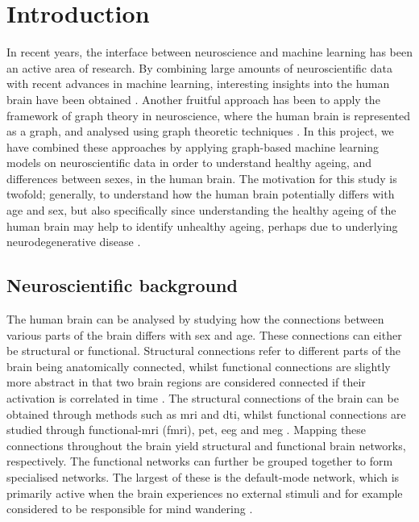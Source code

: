\chapter{Introduction}

In recent years, the interface between neuroscience and machine learning has been an active area of research. By combining large amounts of neuroscientific data with recent advances in machine learning, interesting insights into the human brain have been obtained \cite{neuro_ml, amoroso_multiplex_age, amoroso_multiplex_ad}. Another fruitful approach has been to apply the framework of graph theory in neuroscience, where the human brain is represented as a graph, and analysed using graph theoretic techniques \cite{chan, braph}. In this project, we have combined these approaches by applying graph-based machine learning models on neuroscientific data in order to understand healthy ageing, and differences between sexes, in the human brain. The motivation for this study is twofold; generally, to understand how the human brain potentially differs with age and sex, but also specifically since understanding the healthy ageing of the human brain may help to identify unhealthy ageing, perhaps due to underlying neurodegenerative disease \cite{kaufmann}. 

\section{Neuroscientific background}

The human brain can be analysed by studying how the connections between various parts of the brain differs with sex and age. These connections can either be structural or functional. Structural connections refer to different parts of the brain being anatomically connected, whilst functional connections are slightly more abstract in that two brain regions are considered connected if their activation is correlated in time \cite{sporns}. The structural connections of the brain can be obtained through methods such as \acrshort{mri} and \acrshort{dti}, whilst functional connections are studied through functional-\acrshort{mri} (\acrshort{fmri}), \acrshort{pet}, \acrshort{eeg} and \acrshort{meg} \cite{hirsch}. Mapping these connections throughout the brain yield structural and functional brain networks, respectively. The functional networks can further be grouped together to form specialised networks. The largest of these is the default-mode network, which is primarily active when the brain experiences no external stimuli and for example considered to be responsible for mind wandering \cite{alves_dmn}.

